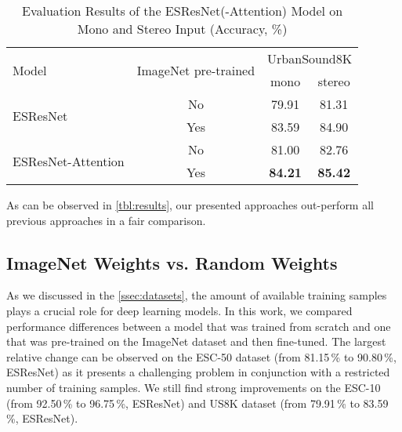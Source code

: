 \documentclass[a4paper,conference]{IEEEtran}
\newcommand{\ra}[1]{\renewcommand{\arraystretch}{#1}}
\begin{document}
\begin{table}[ht]
\caption{Evaluation Results of the \mbox{ESResNet(-Attention)} Model on Mono and Stereo Input (Accuracy, \%)}
\label{tbl:results_us8k}
\ra{1.2}
\begin{tabularx}{\linewidth}{Xccc}
\toprule
\multicolumn{1}{l}{\multirow{2}{*}{Model}} & \multicolumn{1}{l}{\multirow{2}{*}{ImageNet pre-trained}} & \multicolumn{2}{c}{UrbanSound8K} \\ \cmidrule(l){3-4} 
 & & \multicolumn{1}{c}{mono} & \multicolumn{1}{c}{stereo} \\ \midrule
\multicolumn{1}{l}{\multirow{2}{*}{ESResNet}} & No & 79.91 & 81.31 \\
& Yes & 83.59 & 84.90 \\
\multicolumn{1}{l}{\multirow{2}{*}{ESResNet-Attention}} & No & 81.00 & 82.76 \\
 & Yes & \textbf{84.21} & \textbf{85.42} \\ \bottomrule
\end{tabularx}
\end{table}

As can be observed in \autoref{tbl:results}, our presented approaches out-perform all previous approaches in a fair comparison.

\subsection{ImageNet Weights vs. Random Weights} \label{ssec:imagenet_vs_random}
As we discussed in the \autoref{ssec:datasets}, the amount of available training samples plays a crucial role for deep learning models.
In this work, we compared performance differences between a model that was trained from scratch and one that was pre-trained on the ImageNet dataset and then fine-tuned.
The largest relative change can be observed on the \mbox{ESC-50} dataset (from 81.15\,\% to 90.80\,\%, \mbox{ESResNet}) as it presents a challenging problem in conjunction with a restricted number of training samples.
We still find strong improvements on the \mbox{ESC-10} (from 92.50\,\% to 96.75\,\%, \mbox{ESResNet}) and US8K dataset (from 79.91\,\% to 83.59\,\%, \mbox{ESResNet}).
\end{document}
